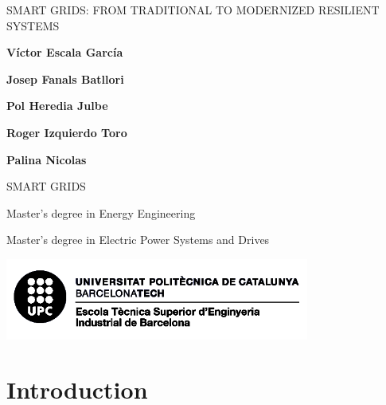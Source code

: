 \documentclass[10pt, a4paper]{report}
\begin{document}
\begin{titlepage}
   \begin{center}
      \vspace*{2em}
       {\Large SMART GRIDS: FROM TRADITIONAL TO MODERNIZED RESILIENT SYSTEMS}

       \vspace{6em}

       \textbf{Víctor Escala García}

       \textbf{Josep Fanals Batllori}

       \textbf{Pol Heredia Julbe}

       \textbf{Roger Izquierdo Toro}

       \textbf{Palina Nicolas}

       \vfill

       \vspace{1em}

       SMART GRIDS

       Master's degree in Energy Engineering

       Master's degree in Electric Power Systems and Drives

       \vspace{8em}
     
       \includegraphics[width=10cm]{Data/Logo.png}
            
   \end{center}
\end{titlepage}



\tableofcontents{}


\chapter{Introduction}



\printbibliography
\end{document}
